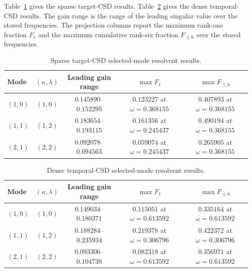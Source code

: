 \documentclass[11pt]{article}
\begin{document}
Table~\ref{tab:resolvent_sparse_results} gives the sparse target-CSD results.
Table~\ref{tab:resolvent_dense_results} gives the dense temporal-CSD results.
The gain range is the range of the leading singular value over the stored
frequencies. The projection columns report the maximum rank-one fraction
\(F_1\) and the maximum cumulative rank-six fraction \(F_{\le6}\) over the
stored frequencies.

\begin{table}[H]
  \centering
  \caption{Sparse target-CSD selected-mode resolvent results.}
  \label{tab:resolvent_sparse_results}
  \begin{tabular}{lcccc}
    \toprule
    Mode & \((\kappa,\lambda)\) & Leading gain range
      & \(\max F_1\) & \(\max F_{\le6}\) \\
    \midrule
    \((1,0)\) & \((1,0)\) & \(0.145890\)--\(0.152295\)
      & \(0.123227\) at \(\omega=0.368155\)
      & \(0.407893\) at \(\omega=0.368155\) \\
    \((1,1)\) & \((1,2)\) & \(0.183654\)--\(0.193115\)
      & \(0.161356\) at \(\omega=0.245437\)
      & \(0.490194\) at \(\omega=0.368155\) \\
    \((2,1)\) & \((2,2)\) & \(0.092078\)--\(0.094563\)
      & \(0.059074\) at \(\omega=0.245437\)
      & \(0.265905\) at \(\omega=0.368155\) \\
    \bottomrule
  \end{tabular}
\end{table}

\begin{table}[H]
  \centering
  \caption{Dense temporal-CSD selected-mode resolvent results.}
  \label{tab:resolvent_dense_results}
  \begin{tabular}{lcccc}
    \toprule
    Mode & \((\kappa,\lambda)\) & Leading gain range
      & \(\max F_1\) & \(\max F_{\le6}\) \\
    \midrule
    \((1,0)\) & \((1,0)\) & \(0.149034\)--\(0.180371\)
      & \(0.115051\) at \(\omega=0.613592\)
      & \(0.335164\) at \(\omega=0.613592\) \\
    \((1,1)\) & \((1,2)\) & \(0.188284\)--\(0.235934\)
      & \(0.219378\) at \(\omega=0.306796\)
      & \(0.422372\) at \(\omega=0.306796\) \\
    \((2,1)\) & \((2,2)\) & \(0.093306\)--\(0.104738\)
      & \(0.082318\) at \(\omega=0.613592\)
      & \(0.356971\) at \(\omega=0.613592\) \\
    \bottomrule
  \end{tabular}
\end{table}
\end{document}
